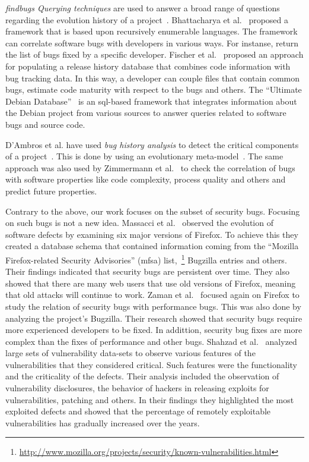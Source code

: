 \documentclass[conference]{IEEEtran}
\begin{document}
{\it findbugs Querying techniques} are used to answer a broad range of questions
regarding the evolution history of a project~\cite{HG05}. Bhattacharya et
al.~\cite{BN11, B11} proposed a framework that is based upon
recursively enumerable languages. The framework can correlate software
bugs with developers in various ways. For instanse, return the list of
bugs fixed by a specific developer. Fischer et al.~\cite{FPG03} proposed
an approach for populating a release history database that combines code
information with bug tracking data. In this way, a developer can couple files
that contain common bugs, estimate code maturity with respect to the bugs
and others. The ``Ultimate Debian Database''~\cite{NZ10} is an {\sc sql}-based
framework that integrates information about the Debian project from various
sources to answer queries related to software bugs and source code.

D'Ambros et al. have used {\it bug history analysis} to detect
the critical components of a project~\cite{D08}. This is done by using an
evolutionary meta-model~\cite{DL08}. The same approach was
also used by Zimmermann et al.~\cite{ZNA08} to check the correlation
of bugs with software properties like code complexity, process quality and others
and predict future properties.

Contrary to the above, our work focuses on the subset of security bugs.
Focusing on such bugs is not a new idea. Massacci et al.~\cite{MNN11} observed
the evolution of software defects by examining six major versions of Firefox.
To achieve this they created a database schema that contained information
coming from the ``Mozilla Firefox-related Security Advisories'' ({\sc mfsa})
list,~\footnote{\url{http://www.mozilla.org/projects/security/known-vulnerabilities.html}}
Bugzilla entries and others. Their findings indicated that security bugs are
persistent over time. They also showed that there are many web users that use
old versions of Firefox, meaning that old attacks will continue to work.
Zaman et al.~\cite{ZAH11} focused again on Firefox to study the relation of
security bugs with performance bugs. This was also done by analyzing the project's
Bugzilla. Their research showed that security bugs require more experienced developers
to be fixed. In addittion, security bug fixes are more complex than the
fixes of performance and other bugs.
Shahzad et al.~\cite{SSL12} analyzed large sets of vulnerability data-sets to observe
various features of the vulnerabilities that they considered critical. Such features
were the functionality and the criticality of the defects. Their analysis
included the observation of vulnerability disclosures, the behavior of
hackers in releasing exploits for vulnerabilities, patching and others. In
their findings they highlighted the most exploited defects and showed that
the percentage of remotely exploitable vulnerabilities has gradually increased
over the years.
\end{document}
